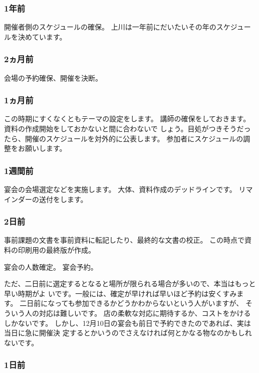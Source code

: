 \documentclass[mingoth,a4paper]{jsarticle}
\begin{document}
\subsubsection{1年前}

開催者側のスケジュールの確保。
上川は一年前にだいたいその年のスケジュールを決めています。

\subsubsection{2ヵ月前}

会場の予約確保、開催を決断。

\subsubsection{1ヵ月前}

この時期にすくなくともテーマの設定をします。
講師の確保をしておきます。資料の作成開始をしておかないと間に合わないで
しょう。目処がつきそうだったら、開催のスケジュールを対外的に公表します。
参加者にスケジュールの調整をお願いします。

\subsubsection{1週間前}

宴会の会場選定などを実施します。
大体、資料作成のデッドラインです。
リマインダーの送付をします。

\subsubsection{2日前}

事前課題の文書を事前資料に転記したり、最終的な文書の校正。
この時点で資料の印刷用の最終版が作成。

宴会の人数確定。
宴会予約。

ただ、二日前に選定するとなると場所が限られる場合が多いので、本当はもっと早い時期がよ
いです。一般には、確定が早ければ早いほど予約は安くすみます。
二日前になっても参加できるかどうかわからないという人がいますが、
そういう人の対応は難しいです。
店の柔軟な対応に期待するか、コストをかけるしかないです。
しかし、12月10日の宴会も前日で予約できたのであれば、実は当日に急に開催決
定するとかいうのでさえなければ何とかなる物なのかもしれないです。

\subsubsection{1日前}
\end{document}
